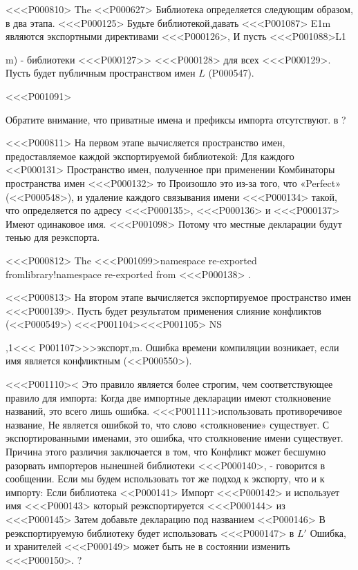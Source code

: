 {{{{{{{{{{{{{{{<<<P000810>%
The
<<P000627>
Библиотека определяется следующим образом, в два этапа.
<<<P000125> Будьте библиотекой,давать <<<P001087> E}{1}{m} являются экспортными директивами <<<P000126>,
И пусть <<<P001088>{L}{1}{m) - библиотеки
<<<P000127>> <<<P000128> для всех <<<P000129>.
Пусть  будет публичным пространством имен $L$
(P000547).

<<<P001091>{%
Обратите внимание, что приватные имена и префиксы импорта отсутствуют.
в %
?

<<<P000811>%
На первом этапе вычисляется пространство имен, предоставляемое каждой экспортируемой библиотекой:
Для каждого <<P000131>
Пространство имен, полученное при применении
Комбинаторы пространства имен <<<P000132> то
Произошло это из-за того, что «Perfect»
(<<P000548>),
и удаление каждого связывания имени <<<P000134> такой, что
 определяется по адресу <<<P000135>,
<<<P000136> и <<<P000137> Имеют одинаковое имя.
<<<P001098> Потому что местные декларации будут тенью для реэкспорта.

<<<P000812>%
The
<<<P001099>{namespace re-exported from}{library!namespace re-exported from}
<<<P000138> .

<<<P000813>%
На втором этапе вычисляется экспортируемое пространство имен <<<P000139>.
Пусть  будет результатом применения
слияние конфликтов
(<<P000549>)
<<<P001104><<<P001105> NS}}{,1}{<<< P001107>>>{экспорт},m}.
Ошибка времени компиляции возникает, если имя
является конфликтным
(<<P000550>).

<<<P001110><%
Это правило является более строгим, чем соответствующее правило для импорта:
Когда две импортные декларации имеют столкновение названий, это всего лишь ошибка.
<<<P001111>{использовать} противоречивое название,
Не является ошибкой то, что слово «столкновение» существует.
С экспортированными именами, это ошибка, что столкновение имени существует.
Причина этого различия заключается в том, что
Конфликт может бесшумно разорвать импортеров нынешней библиотеки <<<P000140>, - говорится в сообщении.
Если мы будем использовать тот же подход к экспорту, что и к импорту:
Если библиотека <<P000141> Импорт <<<P000142>
и использует имя <<<P000143> который реэкспортируется <<<P000144> из <<<P000145>
Затем добавьте декларацию под названием <<P000146>
В реэкспортируемую библиотеку
будет использовать <<<P000147> в $L'$ Ошибка,
и хранителей <<<P000149> может быть не в состоянии изменить <<<P000150>.%
?

}}}}}}}}}}}}}}
